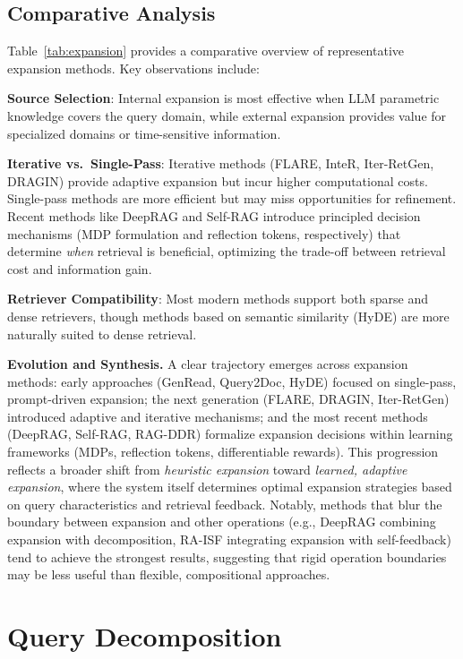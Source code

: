 \documentclass{article}
\begin{document}
\subsection{Comparative Analysis}

Table~\ref{tab:expansion} provides a comparative overview of representative expansion methods. Key observations include:

\textbf{Source Selection}: Internal expansion is most effective when LLM parametric knowledge covers the query domain, while external expansion provides value for specialized domains or time-sensitive information.

\textbf{Iterative vs.\ Single-Pass}: Iterative methods (FLARE, InteR, Iter-RetGen, DRAGIN) provide adaptive expansion but incur higher computational costs. Single-pass methods are more efficient but may miss opportunities for refinement. Recent methods like DeepRAG and Self-RAG introduce principled decision mechanisms (MDP formulation and reflection tokens, respectively) that determine \textit{when} retrieval is beneficial, optimizing the trade-off between retrieval cost and information gain.

\textbf{Retriever Compatibility}: Most modern methods support both sparse and dense retrievers, though methods based on semantic similarity (HyDE) are more naturally suited to dense retrieval.

\textbf{Evolution and Synthesis.} A clear trajectory emerges across expansion methods: early approaches (GenRead, Query2Doc, HyDE) focused on single-pass, prompt-driven expansion; the next generation (FLARE, DRAGIN, Iter-RetGen) introduced adaptive and iterative mechanisms; and the most recent methods (DeepRAG, Self-RAG, RAG-DDR) formalize expansion decisions within learning frameworks (MDPs, reflection tokens, differentiable rewards). This progression reflects a broader shift from \textit{heuristic expansion} toward \textit{learned, adaptive expansion}, where the system itself determines optimal expansion strategies based on query characteristics and retrieval feedback. Notably, methods that blur the boundary between expansion and other operations (e.g., DeepRAG combining expansion with decomposition, RA-ISF integrating expansion with self-feedback) tend to achieve the strongest results, suggesting that rigid operation boundaries may be less useful than flexible, compositional approaches.

\section{Query Decomposition}\label{sec:decomposition}
\end{document}
